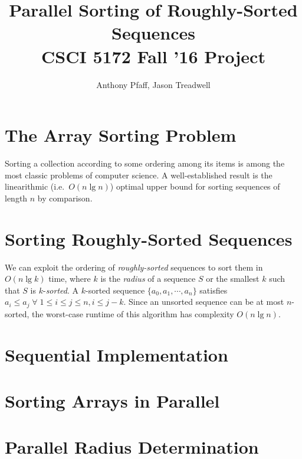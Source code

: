 \documentclass[letterpaper, 12pt]{article}
\title{Parallel Sorting of Roughly-Sorted Sequences\\CSCI 5172 Fall '16 Project}
\author{Anthony Pfaff, Jason Treadwell}
\begin{document}
\maketitle

\section{The Array Sorting Problem}

Sorting a collection according to some ordering among its items is among the most classic problems of computer science.
A well-established result is the linearithmic  (i.e.\ $O(n \lg n)$) optimal upper bound for sorting sequences of length $n$ by
  comparison.

\section{Sorting Roughly-Sorted Sequences}

We can exploit the ordering of \textit{roughly-sorted} sequences to sort them in $O(n \lg k)$ time, where $k$ is the
  \textit{radius} of a sequence $S$ or the smallest $k$ such that $S$ is $k$-\textit{sorted}.\cite{altman89}
A $k$-sorted sequence $\{a_0, a_1, \cdots, a_n\}$ satisfies $a_i \leq a_j \;\forall\; 1 \leq i \leq j \leq n, i \leq j - k$.
Since an unsorted sequence can be at most $n$-sorted, the worst-case runtime of this algorithm has complexity $O(n \lg n)$.

\section{Sequential Implementation}

\section{Sorting Arrays in Parallel}

\section{Parallel Radius Determination}

\begin{sidewaysfigure}

\vspace{-4ex}
\caption{\label{fig:seqpar2}{\em
  Radius Determination Runtimes over Arrays of Length $n\cdot 10^6$, $k = 2$
}}
\end{sidewaysfigure}

\begin{sidewaysfigure}

\vspace{-4ex}
\caption{\label{fig:seqpar100}{\em
  Radius Determination Runtimes over Arrays of Length $n\cdot 10^6$, $k = 100$
}}
\end{sidewaysfigure}
\end{document}
